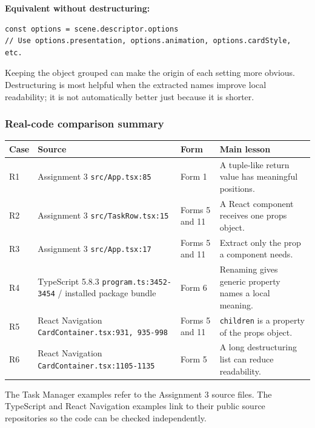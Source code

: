 \documentclass[
]{article}
\newcommand{\passthrough}[1]{#1}
\begin{document}
\textbf{Equivalent without destructuring:}

\begin{lstlisting}
const options = scene.descriptor.options
// Use options.presentation, options.animation, options.cardStyle, etc.
\end{lstlisting}

Keeping the object grouped can make the origin of each setting more
obvious. Destructuring is most helpful when the extracted names improve
local readability; it is not automatically better just because it is
shorter.

\subsubsection{Real-code comparison
summary}\label{real-code-comparison-summary}

\begin{longtable}[]{@{}llll@{}}
\toprule\noalign{}
Case & Source & Form & Main lesson \\
\midrule\noalign{}
\endhead
\bottomrule\noalign{}
\endlastfoot
R1 & Assignment 3 \passthrough{\lstinline!src/App.tsx:85!} & Form 1 & A
tuple-like return value has meaningful positions. \\
R2 & Assignment 3 \passthrough{\lstinline!src/TaskRow.tsx:15!} & Forms 5
and 11 & A React component receives one props object. \\
R3 & Assignment 3 \passthrough{\lstinline!src/App.tsx:17!} & Forms 5 and
11 & Extract only the prop a component needs. \\
R4 & TypeScript 5.8.3 \passthrough{\lstinline!program.ts:3452-3454!} /
installed package bundle & Form 6 & Renaming gives generic property
names a local meaning. \\
R5 & React Navigation
\passthrough{\lstinline!CardContainer.tsx:931, 935-998!} & Forms 5 and
11 & \passthrough{\lstinline!children!} is a property of the props
object. \\
R6 & React Navigation
\passthrough{\lstinline!CardContainer.tsx:1105-1135!} & Form 5 & A long
destructuring list can reduce readability. \\
\end{longtable}

The Task Manager examples refer to the Assignment 3 source files. The
TypeScript and React Navigation examples link to their public source
repositories so the code can be checked independently.
\end{document}
